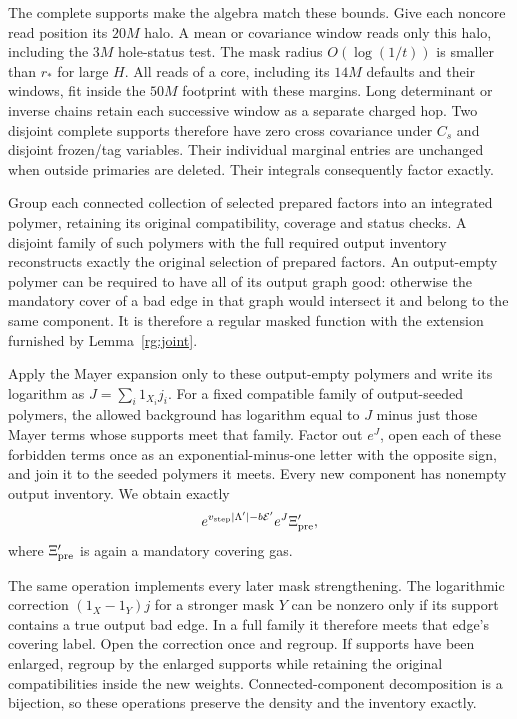 The complete supports make the algebra match these bounds.  Give
each noncore read position its $20M$ halo.  A mean or covariance
window reads only this halo, including the $3M$ hole-status test.
The mask radius $O(\log(1/t))$ is smaller than $r_*$ for large $H$.
All reads of a core, including its $14M$ defaults and their windows,
fit inside the $50M$ footprint with these margins.  Long determinant
or inverse chains retain each successive window as a separate
charged hop.  Two disjoint complete supports therefore have zero
cross covariance under $C_s$ and disjoint frozen/tag variables.
Their individual marginal entries are unchanged when outside
primaries are deleted.  Their integrals consequently factor exactly.

Group each connected collection of selected prepared factors into
an integrated polymer, retaining its original compatibility,
coverage and status checks.  A disjoint family of such polymers
with the full required output inventory reconstructs exactly the
original selection of prepared factors.  An output-empty polymer
can be required to have all of its output graph good: otherwise the
mandatory cover of a bad edge in that graph would intersect it and
belong to the same component.  It is therefore a regular masked
function with the extension furnished by Lemma~\ref{rg:joint}.

Apply the Mayer expansion only to these output-empty polymers and
write its logarithm as $J=\sum_i1_{X_i}j_i$.  For a fixed compatible
family of output-seeded polymers, the allowed background has
logarithm equal to $J$ minus just those Mayer terms whose supports
meet that family.  Factor out $e^J$, open each of these forbidden
terms once as an exponential-minus-one letter with the opposite
sign, and join it to the seeded polymers it meets.  Every new
component has nonempty output inventory.  We obtain exactly
\begin{equation}
 e^{v_{\rm step}|\Lambda'|-b\mathcal E'}e^J\Xi'_{\rm pre},
 \label{rg:preliminary-output}
\end{equation}
where $\Xi'_{\rm pre}$ is again a mandatory covering gas.

The same operation implements every later mask strengthening.  The
logarithmic correction $(1_X-1_Y)j$ for a stronger mask $Y$ can be
nonzero only if its support contains a true output bad edge.  In a
full family it therefore meets that edge's covering label.  Open
the correction once and regroup.  If supports have been enlarged,
regroup by the enlarged supports while retaining the original
compatibilities inside the new weights.  Connected-component
decomposition is a bijection, so these operations preserve the
density and the inventory exactly.

